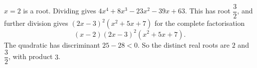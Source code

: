 $x=2$ is a root. Dividing gives $4x^4+8x^3-23x^2-39x+63$. This has root $\dfrac32$, and further division gives $(2x-3)^2(x^2+5x+7)$ for the complete factorisation
\[(x-2)(2x-3)^2(x^2+5x+7).\]
The quadratic has discriminant $25-28<0$. So the distinct real roots are $2$ and $\dfrac32$, with product $\boxed{3}$.
